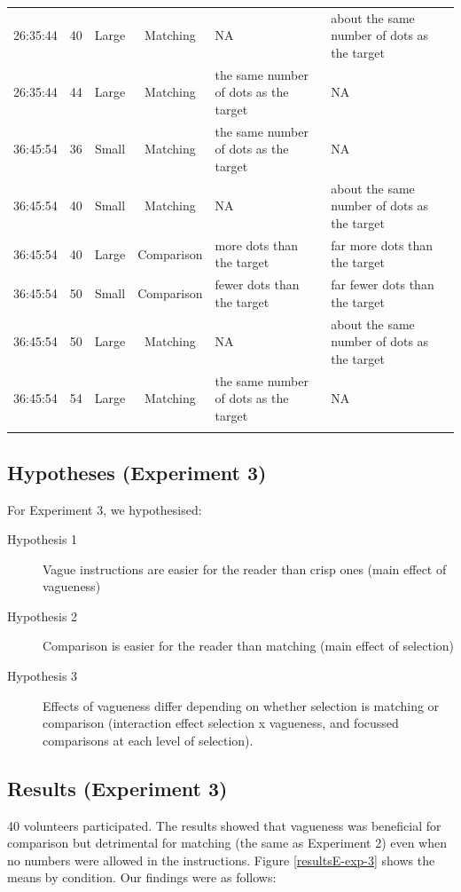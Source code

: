\begin{table}
{\begin{tabular}{ccccll}
26:35:44 &  40 & Large & Matching 	& NA & about the same number of dots as the target \\ 
26:35:44 &  44 & Large & Matching 	& the same number of dots as the target & NA \\ 
\noalign{\smallskip}\hline\noalign{\smallskip}
36:45:54 &  36 & Small & Matching 	& the same number of dots as the target & NA \\ 
36:45:54 &  40 & Small & Matching 	& NA & about the same number of dots as the target \\ 
36:45:54 &  40 & Large & Comparison & more dots than the target & far more dots than the target \\ 
36:45:54 &  50 & Small & Comparison & fewer dots than the target & far fewer dots than the target \\ 
36:45:54 &  50 & Large & Matching 	& NA & about the same number of dots as the target \\ 
36:45:54 &  54 & Large & Matching 	& the same number of dots as the target & NA \\ 
\noalign{\smallskip}\hline
\end{tabular}}
\end{table}

\subsection{Hypotheses (Experiment 3)}

For Experiment 3, we hypothesised:

\begin{description}
	\item [Hypothesis 1] Vague instructions are easier for the reader than crisp ones (main effect of vagueness)
	\item [Hypothesis 2] Comparison is easier for the reader than matching (main effect of selection)
	\item [Hypothesis 3] Effects of vagueness differ depending on whether selection is matching or comparison (interaction effect selection x vagueness, and focussed comparisons at each level of selection).
\end{description}

\subsection{Results (Experiment 3)}
40 volunteers participated. The results showed that vagueness was beneficial for comparison but detrimental for matching (the same as Experiment 2) even when no numbers were allowed in the instructions. Figure \ref{resultsE-exp-3} shows the means by condition. Our findings were as follows:

